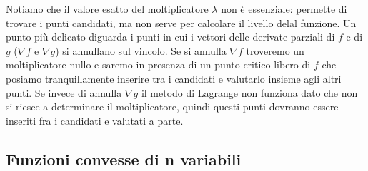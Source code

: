 \newline
Notiamo che il valore esatto del moltiplicatore $\lambda$ non è essenziale: permette di trovare i punti candidati, ma non serve per calcolare il livello delal funzione.\newline
\newline
Un punto più delicato diguarda i punti in cui i vettori delle derivate parziali di $f$ e di $g$ ($\nabla f$ e $\nabla g$) si annullano sul vincolo. Se si annulla $\nabla f$ troveremo un moltiplicatore nullo e saremo in presenza di un punto critico libero di $f$ che posiamo tranquillamente inserire tra i candidati e valutarlo insieme agli altri punti. Se invece di annulla $\nabla g$ il metodo di Lagrange non funziona dato che non si riesce a determinare il moltiplicatore, quindi questi punti dovranno essere inseriti fra i candidati e valutati a parte.
\subsection{Funzioni convesse di n variabili}
